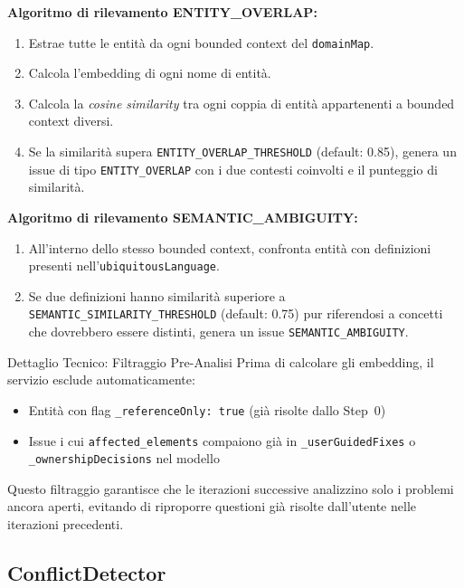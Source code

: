 \documentclass[12pt,a4paper]{report}
\begin{document}
\textbf{Algoritmo di rilevamento ENTITY\_OVERLAP:}
\begin{enumerate}
  \item Estrae tutte le entità da ogni bounded context del \texttt{domainMap}.
  \item Calcola l'embedding di ogni nome di entità.
  \item Calcola la \textit{cosine similarity} tra ogni coppia di entità
        appartenenti a bounded context diversi.
  \item Se la similarità supera \texttt{ENTITY\_OVERLAP\_THRESHOLD} (default: 0.85),
        genera un issue di tipo \texttt{ENTITY\_OVERLAP} con i due contesti
        coinvolti e il punteggio di similarità.
\end{enumerate}

\textbf{Algoritmo di rilevamento SEMANTIC\_AMBIGUITY:}
\begin{enumerate}
  \item All'interno dello stesso bounded context, confronta entità con
        definizioni presenti nell'\texttt{ubiquitousLanguage}.
  \item Se due definizioni hanno similarità superiore a
        \texttt{SEMANTIC\_SIMILARITY\_THRESHOLD} (default: 0.75) pur riferendosi
        a concetti che dovrebbero essere distinti, genera un issue
        \texttt{SEMANTIC\_AMBIGUITY}.
\end{enumerate}

\begin{technicalbox}{Dettaglio Tecnico: Filtraggio Pre-Analisi}
Prima di calcolare gli embedding, il servizio esclude automaticamente:
\begin{itemize}
  \item Entità con flag \texttt{\_referenceOnly: true} (già risolte dallo Step~0)
  \item Issue i cui \texttt{affected\_elements} compaiono già in
        \texttt{\_userGuidedFixes} o \texttt{\_ownershipDecisions} nel modello
\end{itemize}
Questo filtraggio garantisce che le iterazioni successive analizzino solo
i problemi ancora aperti, evitando di riproporre questioni già risolte
dall'utente nelle iterazioni precedenti.
\end{technicalbox}

\subsection{ConflictDetector}
\end{document}
